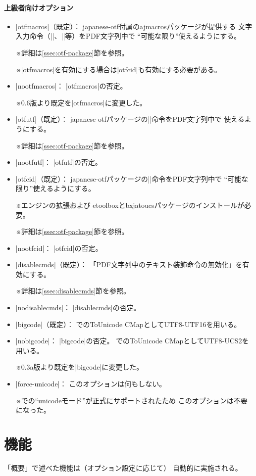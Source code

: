 \documentclass[uplatex,dvipdfmx,a4paper]{jsarticle}
\newcommand{\Pkg}[1]{\textsf{#1}}
\newcommand{\Note}{\par\noindent ※}
\newcommand{\Means}{：\quad}
\begin{document}
\paragraph{上級者向けオプション}\mbox{}
\begin{itemize}
\item |otfmacros|（既定）\Means
  \Pkg{japanese-otf}付属の\Pkg{ajmacros}パッケージが提供する
  文字入力命令（|\ajMaru|、|\ajLig|等）をPDF文字列中で
  “可能な限り”使えるようにする。
  \Note 詳細は\ref{ssec:otf-package}節を参照。
  \Note |otfmacros|を有効にする場合は|otfcid|も有効にする必要がある。
\item |nootfmacros|\Means
  |otfmacros|の否定。
  \Note 0.6版より既定を|otfmacros|に変更した。
\item |otfutf|（既定）\Means
  \Pkg{japanese-otf}パッケージの|\UTF|命令をPDF文字列中で
  使えるようにする。
  \Note 詳細は\ref{ssec:otf-package}節を参照。
\item |nootfutf|\Means
  |otfutf|の否定。
\item |otfcid|（既定）\Means
  \Pkg{japanese-otf}パッケージの|\CID|命令をPDF文字列中で
  “可能な限り”使えるようにする。
  \Note エンジンの{\eTeX}拡張および
  \Pkg{etoolbox}と\Pkg{bxjatoucs}パッケージのインストールが必要。
  \Note 詳細は\ref{ssec:otf-package}節を参照。
\item |nootfcid|\Means
  |otfcid|の否定。
\item |disablecmds|（既定）\Means
  「PDF文字列中のテキスト装飾命令の無効化」を有効にする。
  \Note 詳細は\ref{ssec:disablecmds}節を参照。
\item |nodisablecmds|\Means
  |disablecmds|の否定。
\item |bigcode|（既定）\Means
  {\upTeX}でのToUnicode CMapとしてUTF8-UTF16を用いる。
\item |nobigcode|\Means
  |bigcode|の否定。
  {\upTeX}でのToUnicode CMapとしてUTF8-UCS2を用いる。
  \Note 0.3a版より既定を|bigcode|に変更した。
\item |force-unicode|\Means
  このオプションは何もしない。
  \Note {\pLaTeX}での“unicodeモード”が正式にサポートされたため
  このオプションは不要になった。
\end{itemize}

\section{機能}

「概要」で述べた機能は（オプション設定に応じて）
自動的に実施される。
\end{document}
